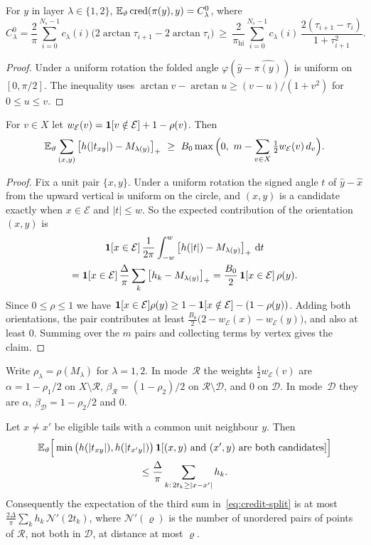 \documentclass[11pt,colorlinks]{charlie}
\newcommand{\cR}{\mathcal{R}}
\newcommand{\cD}{\mathcal{D}}
\newcommand{\cE}{\mathcal{E}}
\newcommand{\pos}[1]{\left[#1\right]_+}
\newcommand{\cred}{\operatorname{cred}}
\newcommand{\pihi}{\pi_{\mathrm{hi}}}
\begin{document}
\begin{lemma}\label{lem:short}
For $y$ in layer $\lambda\in\{1,2\}$, $\E_\vartheta\cred(\pi(y),y)=C^0_\lambda$, where
\[
 C^0_\lambda=\frac2\pi\sum_{i=0}^{N_s-1}c_\lambda(i)\big(2\arctan\tau_{i+1}-2\arctan\tau_i\big)\ \ge\ \frac{2}{\pihi}\sum_{i=0}^{N_s-1}c_\lambda(i)\,\frac{2(\tau_{i+1}-\tau_i)}{1+\tau_{i+1}^2}.
\]
\end{lemma}
\begin{proof}
Under a uniform rotation the folded angle $\varphi(\hat y-\widehat{\pi(y)})$ is uniform on $[0,\pi/2]$. The inequality uses $\arctan v-\arctan u\ge(v-u)/(1+v^2)$ for $0\le u\le v$.
\end{proof}

\begin{lemma}\label{lem:unit}
For $v\in X$ let $w_\cE(v)=\one[v\notin\cE]+1-\rho(v)$. Then
\[
 \E_\vartheta\sum_{(x,y)}\pos{h(|t_{xy}|)-M_{\lambda(y)}}\ \ge\ B_0\max\Big(0,\ m-\sum_{v\in X}\tfrac12w_\cE(v)\,d_v\Big).
\]
\end{lemma}

\begin{proof}
Fix a unit pair $\{x,y\}$. Under a uniform rotation the signed angle $t$ of $\hat y-\hat x$ from the upward vertical is uniform on the circle, and $(x,y)$ is a candidate exactly when $x\in\cE$ and $|t|\le w$. So the expected contribution of the orientation $(x,y)$ is
\begin{multline*}
 \one[x\in\cE]\,\frac{1}{2\pi}\int_{-w}^{w}\pos{h(|t|)-M_{\lambda(y)}}\dd t\\
 =\one[x\in\cE]\,\frac{\Delta}{\pi}\sum_k\pos{h_k-M_{\lambda(y)}}=\frac{B_0}{2}\,\one[x\in\cE]\,\rho(y).
\end{multline*}
Since $0\le\rho\le1$ we have $\one[x\in\cE]\rho(y)\ge1-\one[x\notin\cE]-(1-\rho(y))$. Adding both orientations, the pair contributes at least $\frac{B_0}{2}\big(2-w_\cE(x)-w_\cE(y)\big)$, and also at least $0$. Summing over the $m$ pairs and collecting terms by vertex gives the claim.
\end{proof}

Write $\rho_\lambda=\rho(M_\lambda)$ for $\lambda=1,2$. In mode~$\cR$ the weights $\tfrac12w_\cE(v)$ are $\alpha=1-\rho_1/2$ on $X\setminus\cR$, $\beta_\cR=(1-\rho_2)/2$ on $\cR\setminus\cD$, and $0$ on $\cD$. In mode~$\cD$ they are $\alpha$, $\beta_\cD=1-\rho_2/2$ and $0$.

\begin{lemma}[Collisions]\label{lem:collision}
Let $x\ne x'$ be eligible tails with a common unit neighbour $y$. Then
\begin{multline*}
 \mathbb{E}_\vartheta\Big[\min\big(h(|t_{xy}|),h(|t_{x'y}|)\big)\,\mathbf{1}[(x,y)\text{ and }(x',y)\text{ are both candidates}]\Big]\\
 \le\frac{\Delta}{\pi}\sum_{k:\,2t_k\ge|x-x'|}h_k .
\end{multline*}
Consequently the expectation of the third sum in~\eqref{eq:credit-split} is at most $\frac{2\Delta}{\pi}\sum_kh_k\,\mathcal N'(2t_k)$, where $\mathcal N'(\varrho)$ is the number of unordered pairs of points of $\cR$, not both in $\cD$, at distance at most $\varrho$.
\end{lemma}
\end{document}
